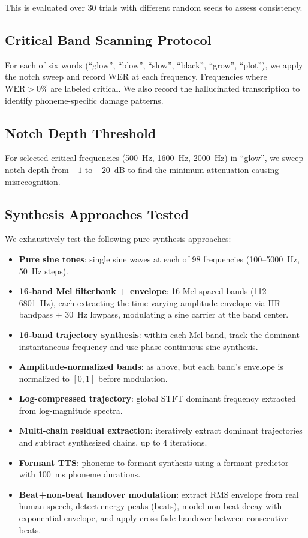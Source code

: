 \documentclass[11pt,a4paper]{article}
\begin{document}
This is evaluated over 30 trials with different random seeds to assess
consistency.

\subsection{Critical Band Scanning Protocol}
For each of six words (``glow'', ``blow'', ``slow'', ``black'', ``grow'',
``plot''), we apply the notch sweep and record WER at each frequency.
Frequencies where $\text{WER} > 0\%$ are labeled critical. We also record the
hallucinated transcription to identify phoneme-specific damage patterns.

\subsection{Notch Depth Threshold}
For selected critical frequencies (500~Hz, 1600~Hz, 2000~Hz) in ``glow'', we
sweep notch depth from $-1$ to $-20$~dB to find the minimum attenuation causing
misrecognition.

\subsection{Synthesis Approaches Tested}
We exhaustively test the following pure-synthesis approaches:
\begin{itemize}[leftmargin=*,itemsep=2pt]
    \item \textbf{Pure sine tones}: single sine waves at each of 98 frequencies
        (100--5000~Hz, 50~Hz steps).
    \item \textbf{16-band Mel filterbank + envelope}: 16 Mel-spaced bands
        (112--6801~Hz), each extracting the time-varying amplitude envelope via
        IIR bandpass + 30~Hz lowpass, modulating a sine carrier at the band
        center.
    \item \textbf{16-band trajectory synthesis}: within each Mel band, track the
        dominant instantaneous frequency and use phase-continuous sine synthesis.
    \item \textbf{Amplitude-normalized bands}: as above, but each band's
        envelope is normalized to $[0,1]$ before modulation.
    \item \textbf{Log-compressed trajectory}: global STFT dominant frequency
        extracted from log-magnitude spectra.
    \item \textbf{Multi-chain residual extraction}: iteratively extract dominant
        trajectories and subtract synthesized chains, up to 4 iterations.
    \item \textbf{Formant TTS}: phoneme-to-formant synthesis using a formant
        predictor with 100~ms phoneme durations.
    \item \textbf{Beat+non-beat handover modulation}: extract RMS envelope from
        real human speech, detect energy peaks (beats), model non-beat decay
        with exponential envelope, and apply cross-fade handover between
        consecutive beats.
\end{itemize}
\end{document}
